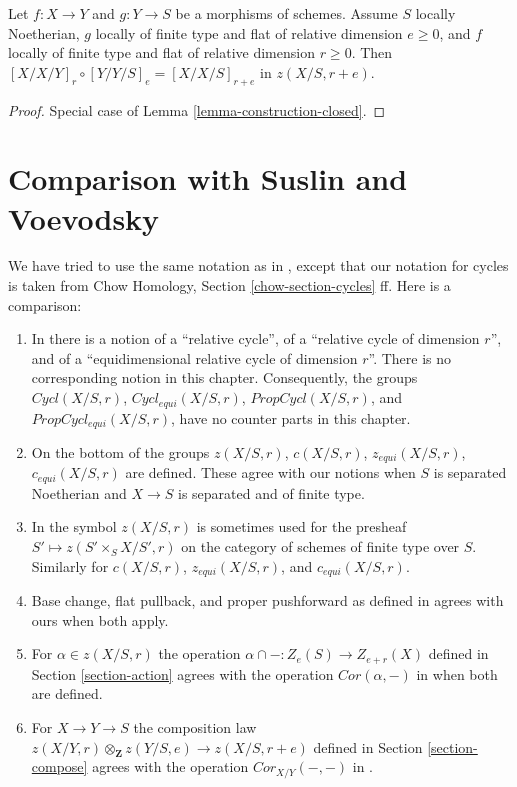 \begin{lemma}
\label{lemma-composition-fundamental-cycles}
Let $f : X \to Y$ and $g : Y \to S$ be a morphisms of schemes.
Assume $S$ locally Noetherian, $g$ locally of finite type and
flat of relative dimension $e \ge 0$, and $f$ locally of finite type
and flat of relative dimension $r \geq 0$. Then
$[X/X/Y]_r \circ [Y/Y/S]_e = [X/X/S]_{r + e}$ in $z(X/S, r + e)$.
\end{lemma}

\begin{proof}
Special case of Lemma \ref{lemma-construction-closed}.
\end{proof}






\section{Comparison with Suslin and Voevodsky}
\label{section-compare}

\noindent
We have tried to use the same notation as in \cite{SV}, except that
our notation for cycles is taken from
Chow Homology, Section \ref{chow-section-cycles} ff.
Here is a comparison:
\begin{enumerate}
\item In \cite[Section 3.1]{SV} there is a notion of a
``relative cycle'', of a ``relative cycle of dimension $r$'', and
of a ``equidimensional relative cycle of dimension $r$''.
There is no corresponding notion in this chapter. Consequently, the groups
$Cycl(X/S, r)$, $Cycl_{equi}(X/S, r)$,
$PropCycl(X/S, r)$, and $PropCycl_{equi}(X/S, r)$,
have no counter parts in this chapter.
\item On the bottom of \cite[page 36]{SV} the groups
$z(X/S, r)$, $c(X/S, r)$, $z_{equi}(X/S, r)$, $c_{equi}(X/S, r)$
are defined. These agree with our notions when $S$ is separated
Noetherian and $X \to S$ is separated and of finite type.
\item In \cite{SV} the symbol $z(X/S, r)$ is sometimes used for the
presheaf $S' \mapsto z(S' \times_S X/S', r)$ on the category of schemes
of finite type over $S$. Similarly for
$c(X/S, r)$, $z_{equi}(X/S, r)$, and $c_{equi}(X/S, r)$.
\item Base change, flat pullback, and proper pushforward
as defined in \cite{SV} agrees with ours when both apply.
\item For $\alpha \in z(X/S, r)$ the operation
$\alpha \cap - : Z_e(S) \to Z_{e + r}(X)$ defined in
Section \ref{section-action} agrees with
the operation $Cor(\alpha, -)$ in \cite[Section 3.7]{SV}
when both are defined.
\item For $X \to Y \to S$ the composition law
$z(X/Y, r) \otimes_\mathbf{Z} z(Y/S, e) \longrightarrow z(X/S, r + e)$
defined in Section \ref{section-compose}
agrees with the operation $Cor_{X/Y}(-, -)$ in
\cite[Corollary 3.7.5]{SV}.
\end{enumerate}











